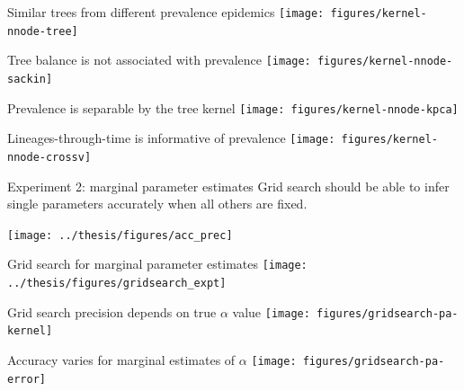 \documentclass{beamer}
\begin{document}
\begin{frame}{Similar trees from different prevalence epidemics}
  \vspace{-0.5cm}
  \texttt{[image: figures/kernel-nnode-tree]}
\end{frame}

\begin{frame}{Tree balance is not associated with prevalence}
  \vspace{-0.5cm}
  \texttt{[image: figures/kernel-nnode-sackin]}
\end{frame}

\begin{frame}{Prevalence is separable by the tree kernel}
  \vspace{-0.5cm}
  \texttt{[image: figures/kernel-nnode-kpca]}
\end{frame}

\begin{frame}{Lineages-through-time is informative of prevalence}
  \vspace{-0.5cm}
  \texttt{[image: figures/kernel-nnode-crossv]}
\end{frame}

\begin{frame}{Experiment 2: marginal parameter estimates}
  Grid search should be able to infer single parameters accurately when all
  others are fixed.

  \texttt{[image: ../thesis/figures/acc\_prec]}
\end{frame}

\begin{frame}{Grid search for marginal parameter estimates}
  \texttt{[image: ../thesis/figures/gridsearch\_expt]}
\end{frame}

\begin{frame}{Grid search precision depends on true $\alpha$ value}
  \vspace{-0.5cm}
  \texttt{[image: figures/gridsearch-pa-kernel]}
\end{frame}

\begin{frame}{Accuracy varies for marginal estimates of $\alpha$}
  \vspace{-0.5cm}
  \texttt{[image: figures/gridsearch-pa-error]}
\end{frame}
\end{document}
